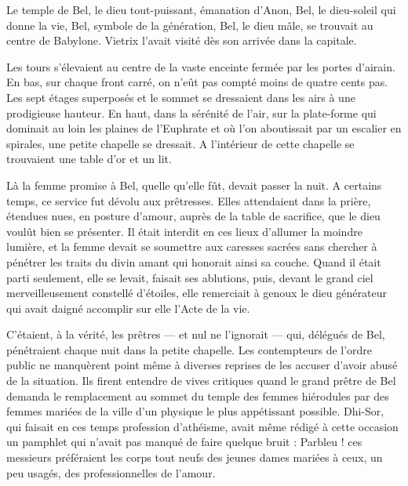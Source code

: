\documentclass[a4paper, 11pt, oneside, polutonikogreek, french]{article}
\begin{document}
\bigskip
\centerline{\EightStarTaper}
\centerline{\EightStarTaper\EightStarTaper}
\bigskip

Le temple de Bel, le dieu tout-puissant, émanation d'Anon, Bel, le dieu-soleil qui donne la vie, Bel, symbole de la génération, Bel, le dieu mâle, se trouvait au centre de Babylone. Vietrix l'avait visité dès son arrivée dans la capitale.

Les tours s'élevaient au centre de la vaste enceinte fermée par les portes d'airain. En bas, sur chaque front carré, on n'eût pas compté moins de quatre cents pas. Les sept étages superposés et le sommet se dressaient dans les airs à une prodigieuse hauteur. En haut, dans la sérénité de l'air, sur la plate-forme qui dominait au loin les plaines de l'Euphrate et où l'on aboutissait par un escalier en spirales, une petite chapelle se dressait. A l'intérieur de cette chapelle se trouvaient une table d'or et un lit.

\bigskip
\centerline{\EightStarTaper}
\centerline{\EightStarTaper\EightStarTaper}
\bigskip

Là la femme promise à Bel, quelle qu'elle fût, devait passer la nuit. A certains temps, ce service fut dévolu aux prêtresses. Elles attendaient dans la prière, étendues nues, en posture d'amour, auprès de la table de sacrifice, que le dieu voulût bien se présenter. Il était interdit en ces lieux d'allumer la moindre lumière, et la femme devait se soumettre aux caresses sacrées sans chercher à pénétrer les traits du divin amant qui honorait ainsi sa couche. Quand il était parti seulement, elle se levait, faisait ses ablutions, puis, devant le grand ciel merveilleusement constellé d'étoiles, elle remerciait à genoux le dieu générateur qui avait daigné accomplir sur elle l'Acte de la vie.

C'étaient, à la vérité, les prêtres --- et nul ne l'ignorait --- qui, délégués de Bel, pénétraient chaque nuit dans la petite chapelle. Les contempteurs de l'ordre public ne manquèrent point même à diverses reprises de les accuser d'avoir abusé de la situation. Ils firent entendre de vives critiques quand le grand prêtre de Bel demanda le remplacement au sommet du temple des femmes hiérodules par des femmes mariées de la ville d'un physique le plus appétissant possible. Dhi-Sor, qui faisait en ces temps profession d'athéisme, avait même rédigé à cette occasion un pamphlet qui n'avait pas manqué de faire quelque bruit : Parbleu ! ces messieurs préféraient les corps tout neufs des jeunes dames mariées à ceux, un peu usagés, des professionnelles de l'amour.
\end{document}
